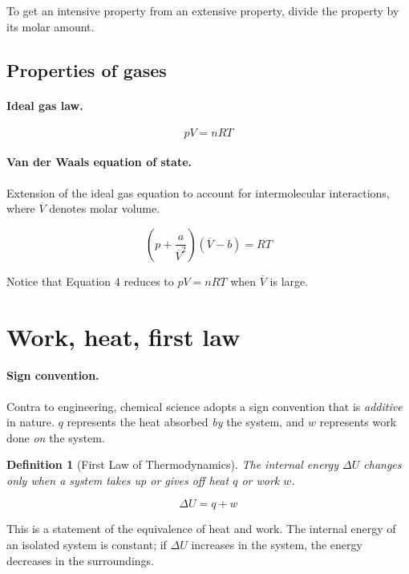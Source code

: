 \documentclass{article}
\numberwithin{theorem}{section}
\numberwithin{corollary}{section}
\numberwithin{postulate}{section}
\numberwithin{lemma}{section}
\newtheorem{definition}{Definition}
\numberwithin{definition}{section}
\begin{document}
To get an intensive property from an extensive property, divide the property by
its molar amount.

\subsection{Properties of gases}

\paragraph{Ideal gas law. }
\begin{equation}
  pV = nRT
\end{equation}

\paragraph{Van der Waals equation of state.} Extension of the ideal gas equation
to account for intermolecular interactions, where $\overline{V}$ denotes molar
volume. 

\begin{equation}
  \left( p + \frac{a}{\overline{V}^2} \right) (\overline{V} - b) = RT 
\end{equation}

Notice that Equation 4 reduces to $pV = nRT$ when $\overline{V}$ is large.

\section{Work, heat, first law}

\paragraph{Sign convention. }Contra to engineering, chemical science adopts
a sign convention that is \textit{additive} in nature. $q$ represents the heat
absorbed \textit{by} the system, and $w$ represents work done \textit{on} the
system.


\begin{definition}[First Law of Thermodynamics]
The internal energy $\Delta U$ changes only when a system takes up or gives off
heat $q$ or work $w$.

  \begin{equation}
    \Delta U = q + w
  \end{equation}
\end{definition}

This is a statement of the equivalence of heat and work. The internal energy of
an isolated system is constant; if $\Delta U$ increases in the system, the
energy decreases in the surroundings.
\end{document}
